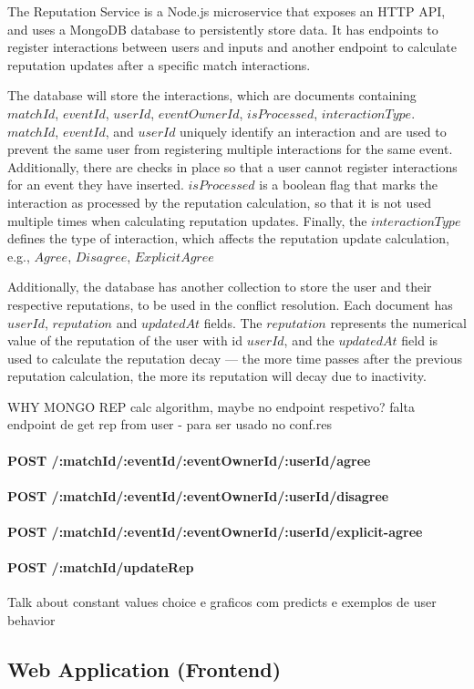 The Reputation Service is a Node.js microservice that exposes an HTTP API, and uses a \mbox{MongoDB} database to persistently store data. It has endpoints to register interactions between users and inputs and another endpoint to calculate reputation updates after a specific match interactions.

The database will store the interactions, which are documents containing $matchId$, $eventId$, $userId$, $eventOwnerId$, $isProcessed$, $interactionType$. $matchId$, $eventId$, and $userId$ uniquely identify an interaction and are used to prevent the same user from registering multiple interactions for the same event. Additionally, there are checks in place so that a user cannot register interactions for an event they have inserted. $isProcessed$ is a boolean flag that marks the interaction as processed by the reputation calculation, so that it is not used multiple times when calculating reputation updates. Finally, the $interactionType$ defines the type of interaction, which affects the reputation update calculation, e.g., $Agree$, $Disagree$, $Explicit Agree$

Additionally, the database has another collection to store the user and their respective reputations, to be used in the conflict resolution. Each document has $userId$, $reputation$ and $updatedAt$ fields. The $reputation$ represents the numerical value of the reputation of the user with id $userId$, and the $updatedAt$ field is used to calculate the reputation decay --- the more time passes after the previous reputation calculation, the more its reputation will decay due to inactivity.

{\Huge WHY MONGO}
{\Huge REP calc algorithm, maybe no endpoint respetivo?}
{\Huge falta endpoint de get rep from user - para ser usado no conf.res}

\paragraph{POST /:matchId/:eventId/:eventOwnerId/:userId/agree}

\paragraph{POST /:matchId/:eventId/:eventOwnerId/:userId/disagree}

\paragraph{POST /:matchId/:eventId/:eventOwnerId/:userId/explicit-agree}

\paragraph{POST /:matchId/updateRep}

{\Huge Talk about constant values choice e graficos com predicts e exemplos de user behavior}

\subsection{Web Application (Frontend)}

